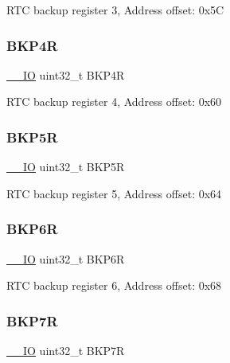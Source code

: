 R\+TC backup register 3, Address offset\+: 0x5C \mbox{\label{struct_r_t_c___type_def_ab13e106cc2eca92d1f4022df3bfdbcd7}} 
\subsubsection{\texorpdfstring{B\+K\+P4R}{BKP4R}}
{\footnotesize\ttfamily \mbox{\hyperlink{core__sc300_8h_aec43007d9998a0a0e01faede4133d6be}{\+\_\+\+\_\+\+IO}} uint32\+\_\+t B\+K\+P4R}

R\+TC backup register 4, Address offset\+: 0x60 \mbox{\label{struct_r_t_c___type_def_ab6bed862c0d0476ff4f89f7b9bf3e130}} 
\subsubsection{\texorpdfstring{B\+K\+P5R}{BKP5R}}
{\footnotesize\ttfamily \mbox{\hyperlink{core__sc300_8h_aec43007d9998a0a0e01faede4133d6be}{\+\_\+\+\_\+\+IO}} uint32\+\_\+t B\+K\+P5R}

R\+TC backup register 5, Address offset\+: 0x64 \mbox{\label{struct_r_t_c___type_def_a1d854d2d7f0452f4c90035952b92d2ba}} 
\subsubsection{\texorpdfstring{B\+K\+P6R}{BKP6R}}
{\footnotesize\ttfamily \mbox{\hyperlink{core__sc300_8h_aec43007d9998a0a0e01faede4133d6be}{\+\_\+\+\_\+\+IO}} uint32\+\_\+t B\+K\+P6R}

R\+TC backup register 6, Address offset\+: 0x68 \mbox{\label{struct_r_t_c___type_def_a2ca54ce1a8d2fa9d1ba6d5987ed5e2cf}} 
\subsubsection{\texorpdfstring{B\+K\+P7R}{BKP7R}}
{\footnotesize\ttfamily \mbox{\hyperlink{core__sc300_8h_aec43007d9998a0a0e01faede4133d6be}{\+\_\+\+\_\+\+IO}} uint32\+\_\+t B\+K\+P7R}

